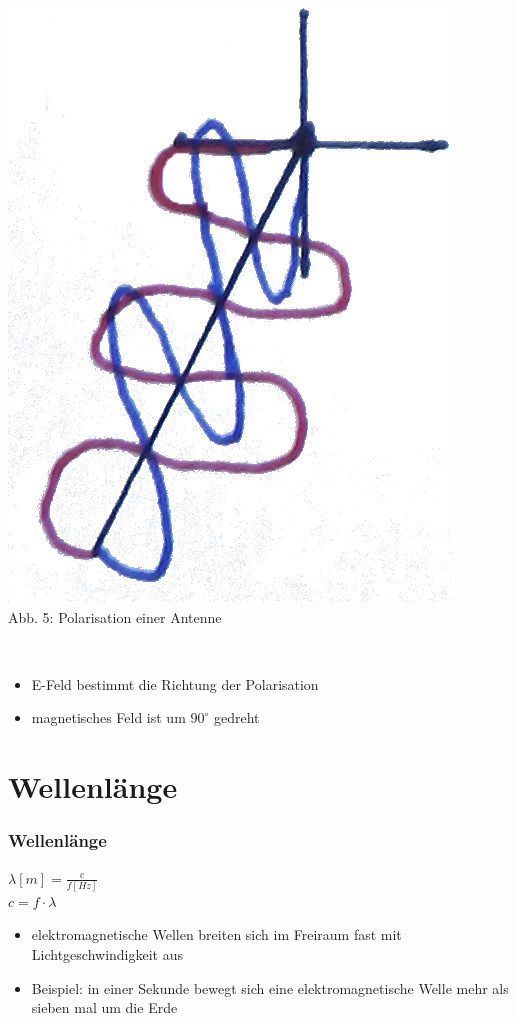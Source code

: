 \begin{frame}
\begin{center}
\begin{minipage}{0.4\textwidth}
		\includegraphics[scale=0.8]{e08/polarisation1.png}\\
		Abb. 5: Polarisation einer Antenne
	\end{minipage}\\
	\begin{itemize}
		\item E-Feld bestimmt die Richtung der Polarisation 
		\item magnetisches Feld ist um $90^\circ$ gedreht
	\end{itemize}
\end{center}
\end{frame}

\section*{Wellenl\"ange}
\begin{frame}
\frametitle{Wellenl\"ange}
\begin{center}
	\Huge$ \lambda [m] = \frac{c}{f [Hz]} $ \\
	\vspace{0.5cm}
	\Huge$ c = f \cdot \lambda $ \\
	\begin{normalsize}		
	\begin{itemize}
		\item elektromagnetische Wellen breiten sich im Freiraum fast mit Lichtgeschwindigkeit aus
		\item Beispiel: in einer Sekunde bewegt sich eine elektromagnetische Welle mehr als sieben mal um die Erde
	\end{itemize}
	\end{normalsize}
\end{center}
\end{frame}

